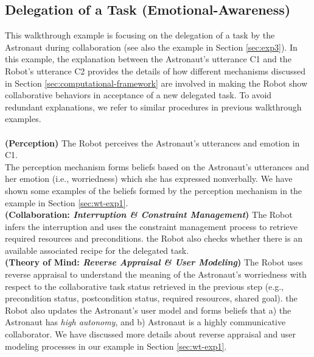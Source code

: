 \subsection{Delegation of a Task (Emotional-Awareness)}
\label{sec:wt-exp3}

This walkthrough example is focusing on the delegation of a task by the
Astronaut during collaboration (see also the example in Section \ref{sec:exp3}).
In this example, the explanation between the Astronaut's utterance C1 and the
Robot's utterance C2 provides the details of how different mechanisms discussed
in Section \ref{sec:computational-framework} are involved in making the Robot 
show collaborative behaviors in acceptance of a new delegated task. To avoid
redundant explanations, we refer to similar procedures in previous walkthrough
examples.\\

\noindent{}\\

\noindent\textbf{(Perception)} The Robot perceives the Astronaut's utterances
and emotion in C1.\\

The perception mechanism forms beliefs based on the Astronaut's utterances and
her emotion (i.e., worriedness) which she has expressed nonverbally. We have
shown some examples of the beliefs formed by the perception mechanism in the
example in Section \ref{sec:wt-exp1}.\\

\noindent\textbf{(Collaboration: \textit{Interruption \& Constraint
Management})} The Robot infers the interruption and uses the constraint
management process to retrieve required resources and preconditions. the Robot
also checks whether there is an available associated recipe for the delegated
task.\\

\noindent\textbf{(Theory of Mind: \textit{Reverse Appraisal \& User Modeling})}
The Robot uses reverse appraisal to understand the meaning of the Astronaut's
worriedness with respect to the collaborative task status retrieved in
the previous step (e.g., precondition status, postcondition status, required
resources, shared goal). the Robot also updates the Astronaut's user model and
forms beliefs that a) the Astronaut has \textit{high autonomy}, and b) Astronaut
is a highly communicative collaborator. We have discussed more details about
reverse appraisal and user modeling processes in our example in Section
\ref{sec:wt-exp1}.\\

